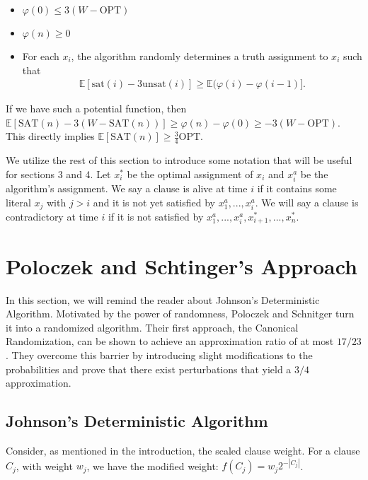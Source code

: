 \documentclass[11pt,letter]{article}
\numberwithin{theorem}{section}
\renewcommand{\phi}{\varphi}
\begin{document}
\begin{itemize}
	\item $\phi(0) \leq 3(W-\textrm{OPT})$
	\item $\phi(n) \geq 0$
	\item For each $x_i$, the algorithm randomly determines a truth assignment to $x_i$ such that
\begin{equation}
\begin{aligned}
\label{eq:2}
\mathbb{E}[\mathrm{sat}(i) - 3\mathrm{unsat}(i)] \geq \mathbb{E}(\phi(i) - \phi(i-1)].
\end{aligned}
\end{equation}
\end{itemize}

If we have such a potential function, then $\mathbb{E}[\textrm{SAT}(n)- 3\left(W-\textrm{SAT}(n)\right)] \geq \phi(n) - \phi(0) \geq -3(W-\textrm{OPT})$.
This directly implies $\mathbb{E}[\textrm{SAT}(n)] \geq \frac{3}{4} \textrm{OPT}$.

We utilize the rest of this section to introduce some notation that will be useful for sections 3 and 4. Let $x_i^*$ be the optimal assignment of $x_i$ and
$x_i^{a}$ be the algorithm's assignment. We say a clause is alive
at time $i$ if it contains some literal $x_j$ with $j > i$ and it is not yet satisfied by $x_1^a,...,x_i^a$.
We will say a clause is contradictory at time $i$ if it is not satisfied by $x_1^a,...,x_i^a,x_{i+1}^*,...,x_n^*$.



\section{Poloczek and Schtinger's Approach}\label{S:PS}

In this section,
we will remind the reader about Johnson's Deterministic Algorithm. Motivated by the power of randomness, Poloczek and Schnitger
turn it into a randomized algorithm. Their first approach, the Canonical Randomization, can be shown to achieve an approximation ratio of at most $17/23$.
They overcome this barrier by introducing slight modifications to the probabilities and prove that there exist perturbations that yield a $3/4$ approximation.

\subsection*{Johnson's Deterministic Algorithm}

Consider, as mentioned in the introduction, the scaled clause weight.
For a clause $C_j$, with weight $w_j$, we have the modified weight:  $f(C_j) = w_j 2^{-|C_j|}$.
\end{document}
